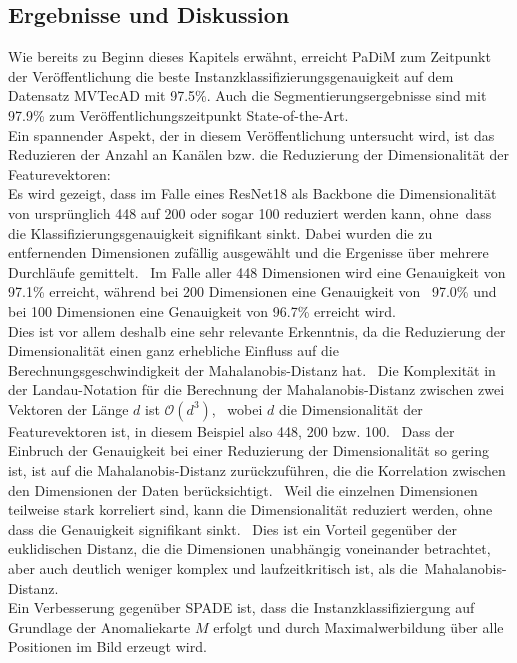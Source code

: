 \subsection{Ergebnisse und Diskussion}\label{subsec:PaDiMResults}
Wie bereits zu Beginn dieses Kapitels erwähnt, erreicht PaDiM zum Zeitpunkt der Veröffentlichung die beste Instanzklassifizierungsgenauigkeit auf dem Datensatz MVTecAD mit \num{97,5}\%. 
Auch die Segmentierungsergebnisse sind mit \num{97,9}\% zum Veröffentlichungszeitpunkt State-of-the-Art. \\
Ein spannender Aspekt, der in diesem Veröffentlichung untersucht wird, ist das Reduzieren der Anzahl an Kanälen bzw. die Reduzierung der Dimensionalität der Featurevektoren: \\
Es wird gezeigt, dass im Falle eines ResNet18 als Backbone die Dimensionalität von ursprünglich \num{448} auf \num{200} oder sogar \num{100} reduziert werden kann, ohne\
dass die Klassifizierungsgenauigkeit signifikant sinkt. Dabei wurden die zu entfernenden Dimensionen zufällig ausgewählt und die Ergenisse über mehrere Durchläufe gemittelt. \
Im Falle aller \num{448} Dimensionen wird eine Genauigkeit von \num{97,1}\% erreicht, während bei \num{200} Dimensionen eine Genauigkeit von \ 
\num{97,0}\% und bei \num{100} Dimensionen eine Genauigkeit von \num{96,7}\% erreicht wird. \\
Dies ist vor allem deshalb eine sehr relevante Erkenntnis, da die Reduzierung der Dimensionalität einen ganz erhebliche Einfluss auf die Berechnungsgeschwindigkeit der Mahalanobis-Distanz hat. \
Die Komplexität in der Landau-Notation für die Berechnung der Mahalanobis-Distanz zwischen zwei Vektoren der Länge $d$ ist $\mathcal{O}(d^{3})$\cite{bishop2006pattern}, \ 
wobei $d$ die Dimensionalität der Featurevektoren ist, in diesem Beispiel also \num{448}, \num{200} bzw. \num{100}. \
Dass der Einbruch der Genauigkeit bei einer Reduzierung der Dimensionalität so gering ist, ist auf die Mahalanobis-Distanz zurückzuführen, die die Korrelation zwischen den Dimensionen der Daten berücksichtigt. \
Weil die einzelnen Dimensionen teilweise stark korreliert sind, kann die Dimensionalität reduziert werden, ohne dass die Genauigkeit signifikant sinkt. \
Dies ist ein Vorteil gegenüber der euklidischen Distanz, die die Dimensionen unabhängig voneinander betrachtet, aber auch deutlich weniger komplex und laufzeitkritisch ist, als die\
Mahalanobis-Distanz. \\
Ein Verbesserung gegenüber SPADE ist, dass die Instanzklassifiziergung auf Grundlage der Anomaliekarte $M$ erfolgt und durch Maximalwerbildung über alle Positionen im Bild erzeugt wird. \
